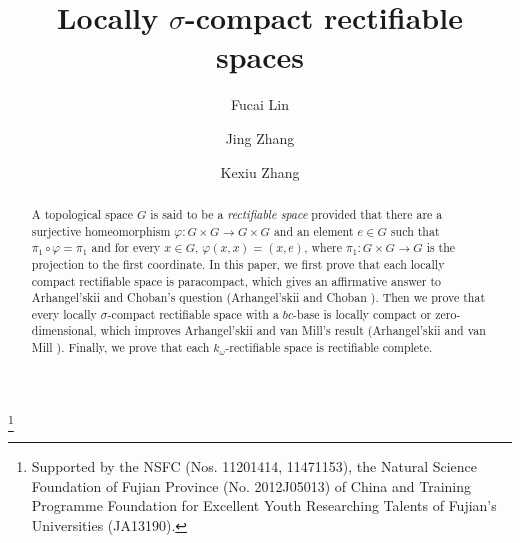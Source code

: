 \documentclass[psamsfonts,fceqn,leqno]{amsart}
\theoremstyle{definition}
\begin{document}
\noindent \vspace{0.5in}

\title[Locally $\sigma$-compact rectifiable spaces]
{Locally $\sigma$-compact rectifiable spaces}

\author{Fucai Lin}
\address{(Fucai Lin): School of mathematics and statistics,
Minnan Normal University, Zhangzhou 363000, P. R. China}

\author{Jing Zhang}
\address{(Jing Zhang) School of mathematics and statistics,
Minnan Normal University, Zhangzhou 363000, P. R. China}

\author{Kexiu Zhang}
\address{(Kexiu Zhang) School of mathematics and statistics,
Minnan Normal University, Zhangzhou 363000, P. R. China}

\thanks{Supported by the NSFC (Nos. 11201414, 11471153), the Natural Science Foundation of Fujian Province (No. 2012J05013) of China
and Training Programme Foundation for Excellent Youth Researching Talents
of Fujian's Universities (JA13190).}


\begin{abstract}
A topological space $G$ is said to be a {\it rectifiable space}
provided that there are a surjective homeomorphism $\varphi :G\times
G\rightarrow G\times G$ and an element $e\in G$ such that
$\pi_{1}\circ \varphi =\pi_{1}$ and for every $x\in G$,
$\varphi (x, x)=(x, e)$, where $\pi_{1}: G\times G\rightarrow G$ is
the projection to the first coordinate. In this paper, we first prove that each locally compact rectifiable space is paracompact, which gives an affirmative answer to Arhangel'skii and Choban's question (Arhangel'skii and Choban \cite{A2009}). Then we prove that every locally $\sigma$-compact rectifiable space with a $bc$-base is
locally compact or zero-dimensional, which improves Arhangel'skii and van Mill's result (Arhangel'skii and van Mill \cite{A2014}). Finally, we prove that each $k_{\omega}$-rectifiable space is rectifiable complete.
\end{abstract}

\maketitle
\end{document}
